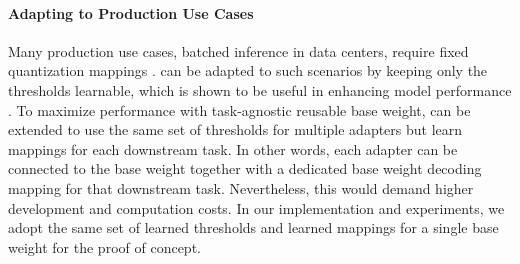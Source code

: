 \begin{table}[ht]
    \centering
    \caption{Perplexities of PiSSA and LoftQ as initialization methods on WikiText-2. 
    Quantization is performed at 2 bits or 4 bits per parameter. Lower values indicate better performance ($\downarrow$).}
    \label{tab:init_compare}
\end{table}





\paragraph{Adapting \FWName{} to Production Use Cases} 
Many production use cases, \eg batched inference in data centers, require fixed quantization mappings \cite{li2024svdqunat,zhao2024atom}. 
\FWName{} can be adapted to such scenarios by keeping only the thresholds learnable, which is shown to be useful in enhancing model performance \cite{liu2022nonuniform}. 
To maximize performance with task-agnostic reusable base weight, \FWName{} can be extended to use the same set of thresholds for multiple adapters but learn mappings for each downstream task. 
In other words, each adapter can be connected to the base weight together with a dedicated base weight decoding mapping for that downstream task. 
Nevertheless, this would demand higher development and computation costs. 
In our implementation and experiments, we adopt the same set of learned thresholds and learned mappings for a single base weight for the proof of concept. 

